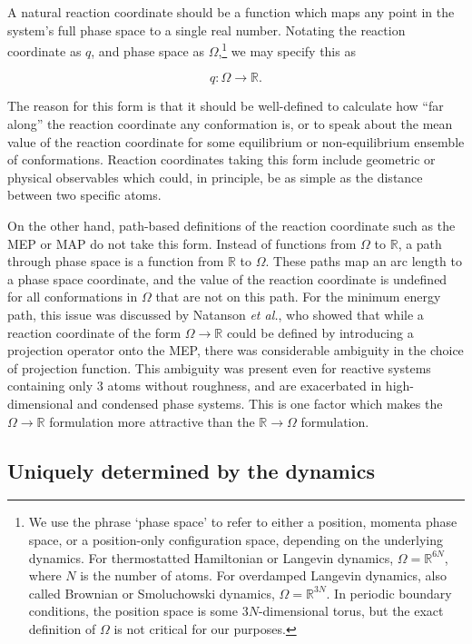 \documentclass[aip, jcp, preprint, linenumbers, nofootinbib]{revtex4-1}
\begin{document}
A natural reaction coordinate should be a function which maps any point in the system's full phase space to a single real number. Notating the reaction coordinate as $q$, and phase space as $\Omega$,\footnote{We use the phrase `phase space' to refer to either a position, momenta phase space, or a position-only configuration space, depending on the underlying dynamics. For thermostatted Hamiltonian or Langevin dynamics, $\Omega=\mathbb{R}^{6N}$, where $N$ is the number of atoms. For overdamped Langevin dynamics, also called Brownian or Smoluchowski dynamics, $\Omega=\mathbb{R}^{3N}$. In periodic boundary conditions, the position space is some $3N$-dimensional torus, but the exact definition of $\Omega$ is not critical for our purposes.} we may specify this as

$$
q : \Omega \rightarrow \mathbb{R}.
$$

The reason for this form is that it should be well-defined to calculate how ``far along'' the reaction coordinate any conformation is, or to speak about the mean value of the reaction coordinate for some equilibrium or non-equilibrium ensemble of conformations. Reaction coordinates taking this form include geometric or physical observables which could, in principle, be as simple as the distance between two specific atoms.

On the other hand, path-based definitions of the reaction coordinate such as the MEP or MAP do not take this form. Instead of functions from $\Omega$ to $\mathbb{R}$, a path through phase space is a function from $\mathbb{R}$ to $\Omega$. These paths map an arc length to a phase space coordinate, and the value of the reaction coordinate is undefined for all conformations in $\Omega$ that are not on this path. For the minimum energy path, this issue was discussed by Natanson \emph{et al.}, \cite{natanson1991definition} who showed that while a reaction coordinate of the form $\Omega \rightarrow \mathbb{R}$ could be defined by introducing a projection operator onto the MEP, there was considerable ambiguity in the choice of projection function. This ambiguity was present even for reactive systems containing only 3 atoms without roughness, and are exacerbated in high-dimensional and condensed phase systems. This is one factor which makes the $\Omega \rightarrow \mathbb{R}$ formulation more attractive than the $\mathbb{R} \rightarrow \Omega$ formulation.

\subsection{Uniquely determined by the dynamics}
\label{sect:uniquely_dertmined}
\end{document}
